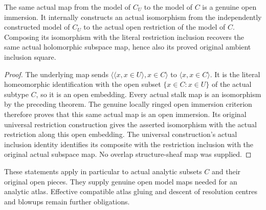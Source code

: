 \begin{theorem}
\label{hir:actual-analytic-subspace-open-restriction-iso}
\leanok
The same actual map from the model of $C_U$ to the model of $C$ is a
genuine open immersion. It internally constructs an actual isomorphism
from the independently constructed model of $C_U$ to the actual open
restriction of the model of $C$. Composing its isomorphism with the
literal restriction inclusion recovers the same actual holomorphic
subspace map, hence also its proved original ambient inclusion square.
\end{theorem}
\begin{proof}
The underlying map sends $\langle\langle x,x\in U\rangle,x\in C\rangle$
to $\langle x,x\in C\rangle$. It is the literal homeomorphic
identification with the open subset $\{x\in C:x\in U\}$ of the actual
subtype $C$, so it is an open embedding. Every actual stalk map is an
isomorphism by the preceding theorem. The genuine locally ringed open
immersion criterion therefore proves that this same actual map is an
open immersion. Its original universal restriction construction gives
the asserted isomorphism with the actual restriction along this open
embedding. The universal construction's actual inclusion identity
identifies its composite with the restriction inclusion with the
original actual subspace map. No overlap structure-sheaf map was supplied.
\end{proof}

These statements apply in particular to actual analytic subsets $C$ and
their original open pieces. They supply genuine open model maps needed
for an analytic atlas. Effective compatible atlas gluing and descent of
resolution centres and blowups remain further obligations.
